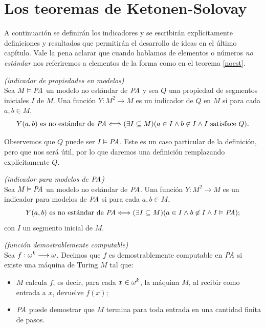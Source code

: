 \section{Los teoremas de Ketonen-Solovay}
A continuación se definirán los indicadores y se escribirán explícitamente definiciones y resultados que permitirán el desarrollo de ideas en el último capítulo.
Vale la pena aclarar que cuando hablamos de elementos o números \textit{no estándar} nos referiremos a elementos de la forma como en el teorema {\ref{noest}}.
\begin{defn} \label{defn42xd} \textit{(indicador de propiedades en modelos)}\\
    Sea $M\vDash\textit{PA}$ un modelo no estándar de $\textit{PA}$ y sea $Q$ una propiedad de segmentos iniciales $I$ de $M$. Una función $Y:M^2\longrightarrow M$ es un indicador de $Q$ en $M$ si para cada $a,b\in M$,
    \[Y(a,b)\text{ es no estándar de }\textit{PA}\Longleftrightarrow (\exists I\subseteq M)(a\in I\land b\not\in I\land I\text{ satisface }Q).\] 
\end{defn}
Observemos que $Q$ puede ser $I\vDash\textit{PA}$. Este es un caso particular de la definición, pero que nos será útil, por lo que daremos una definición remplazando explícitamente $Q$.
\begin{defn} \textit{(indicador para modelos de $\textit{PA}$)}\\
    Sea $M\vDash\textit{PA}$ un modelo no estándar de $\textit{PA}$. Una función $Y:M^2\longrightarrow M$ es un indicador para modelos de $\textit{PA}$ si para cada $a,b\in M$,
    \[Y(a,b)\text{ es no estándar de }\textit{PA}\Longleftrightarrow (\exists I\subseteq M)(a\in I\land b\not\in I\land I\vDash\textit{PA});\]
    con $I$ un segmento inicial de $M$. 
\end{defn}
\begin{defn} \textit{(función demostrablemente computable)}\\
    Sea $f:\omega^k\longrightarrow \omega$. Decimos que $f$ es demostrablemente computable en $\textit{PA}$ si existe una máquina de Turing $M$ tal que:
    \begin{itemize}
        \item $M$ calcula $f$, es decir, para cada $x\in\omega^k$, la máquina $M$, al recibir como entrada a $x$, devuelve $f(x)$;
        \item $\textit{PA}$ puede demostrar que $M$ termina para toda entrada en una cantidad finita de pasos.
            
    \end{itemize}
\end{defn}


